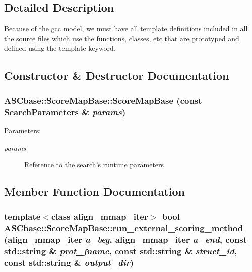 \subsection{Detailed Description}
Because of the gcc model, we must have all template definitions included in all the source files which use the functions, classes, etc that are prototyped and defined using the template keyword. 



\subsection{Constructor \& Destructor Documentation}
\subsubsection{\setlength{\rightskip}{0pt plus 5cm}ASCbase::Score\-Map\-Base::Score\-Map\-Base (const \bf{Search\-Parameters} \& {\em params})\hspace{0.3cm}{\tt  [inline]}}\label{classASCbase_1_1ScoreMapBase_17c627b5ef8a777466b2f9ebc50bd228}


\begin{Desc}
\item[Parameters:]
\begin{description}
\item[{\em params}]Reference to the search's runtime parameters \end{description}
\end{Desc}


\subsection{Member Function Documentation}
\subsubsection{\setlength{\rightskip}{0pt plus 5cm}template$<$class align\_\-mmap\_\-iter$>$ bool ASCbase::Score\-Map\-Base::run\_\-external\_\-scoring\_\-method (align\_\-mmap\_\-iter {\em a\_\-beg}, align\_\-mmap\_\-iter {\em a\_\-end}, const std::string \& {\em prot\_\-fname}, const std::string \& {\em struct\_\-id}, const std::string \& {\em output\_\-dir})\hspace{0.3cm}{\tt  [inline]}}\label{classASCbase_1_1ScoreMapBase_85708eaffffc9a4e36bbd7375b552586}


